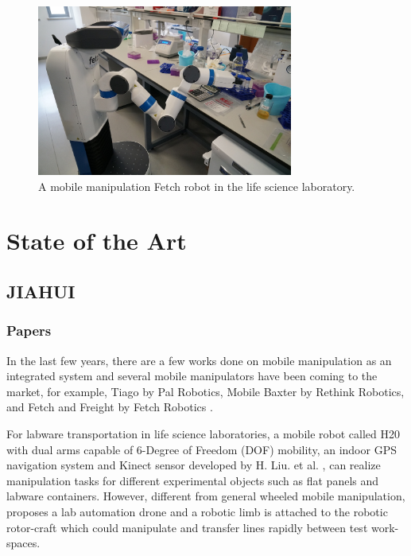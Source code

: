\documentclass[12pt,draftclsnofoot,onecolumn]{IEEEtran}
\begin{document}
	\begin{figure}[H]  %
		\centering
		\includegraphics[width=0.75\textwidth]{img/robot.jpg}
		\caption{
			A mobile manipulation Fetch robot in the life science laboratory.
		}
		\label{robot}
	\end{figure}

	
	
	\section{State of the Art}
	
	\subsection{JIAHUI}
	\subsubsection{Papers}
	In the last few years, there are a few works done on mobile manipulation as an integrated system and several mobile manipulators have been coming to the market, for example, Tiago by Pal Robotics, Mobile Baxter by Rethink Robotics, and Fetch and Freight by Fetch Robotics \cite{roa2015mobile}. 
	
	
	
	For labware transportation in life science laboratories, a mobile robot called H20 with dual arms capable of 6-Degree of Freedom (DOF) mobility, an indoor GPS navigation system and Kinect sensor developed by H. Liu. et al. \cite{liu2013mobile},\cite{ali2016kinematic} can realize manipulation tasks for different experimental objects such as flat panels and labware containers. However, different from general wheeled mobile manipulation, \cite{kim2018lab} proposes a lab automation drone and a robotic limb is attached to the robotic rotor-craft which could manipulate and transfer lines rapidly between test work-spaces. 
	
\end{document}
